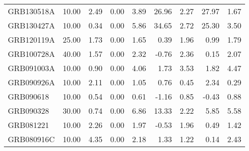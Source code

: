 \begin{tabular}{lrrrrrrrr}
GRB130518A & 10.00 & 2.49 & 0.00 & 3.89 & 26.96 & 2.27 & 27.97 & 1.67 \\
GRB130427A & 10.00 & 0.34 & 0.00 & 5.86 & 34.65 & 2.72 & 25.30 & 3.50 \\
GRB120119A & 25.00 & 1.73 & 0.00 & 1.65 & 0.39 & 1.96 & 0.99 & 1.79 \\
GRB100728A & 40.00 & 1.57 & 0.00 & 2.32 & -0.76 & 2.36 & 0.15 & 2.07 \\
GRB091003A & 10.00 & 0.90 & 0.00 & 4.06 & 1.73 & 3.53 & 1.82 & 4.47 \\
GRB090926A & 10.00 & 2.11 & 0.00 & 1.05 & 0.76 & 0.45 & 2.34 & 0.29 \\
GRB090618 & 10.00 & 0.54 & 0.00 & 0.61 & -1.16 & 0.85 & -0.43 & 0.88 \\
GRB090328 & 30.00 & 0.74 & 0.00 & 6.86 & 13.33 & 2.22 & 5.85 & 5.58 \\
GRB081221 & 10.00 & 2.26 & 0.00 & 1.97 & -0.53 & 1.96 & 0.49 & 1.42 \\
GRB080916C & 10.00 & 4.35 & 0.00 & 2.18 & 1.33 & 1.22 & 0.14 & 2.43 \\
\bottomrule
\end{tabular}
